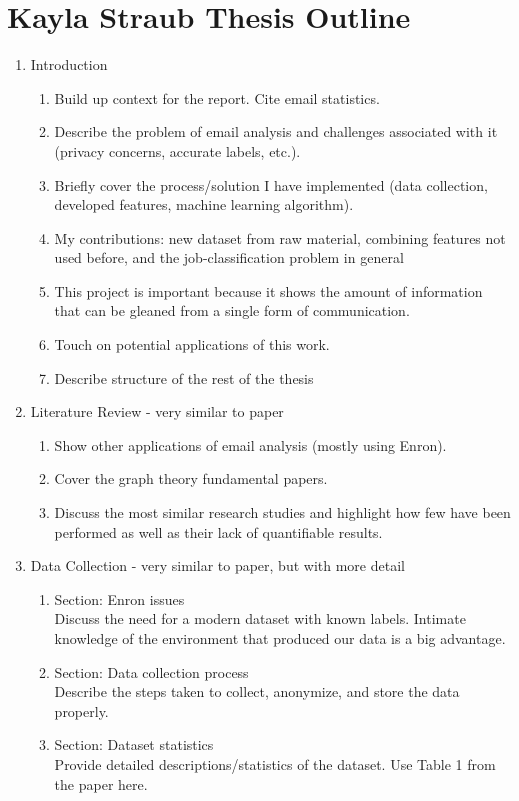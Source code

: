 \documentclass[12pt,dvips]{report}
\begin{document}
\section*{Kayla Straub Thesis Outline}
\begin{enumerate}
\item Introduction 
\begin{enumerate}
\item Build up context for the report.  Cite email statistics.  
\item Describe the problem of email analysis and challenges associated with it (privacy concerns, accurate labels, etc.).  
\item Briefly cover the process/solution I have implemented (data collection, developed features, machine learning algorithm).
\item My contributions: new dataset from raw material, combining features not used before, and the job-classification problem in general 
\item This project is important because it shows the amount of information that can be gleaned from a single form of communication. 
\item Touch on potential applications of this work.
\item Describe structure of the rest of the thesis
\end{enumerate}

\item Literature Review - very similar to paper
\begin{enumerate}
\item Show other applications of email analysis (mostly using Enron).  
\item Cover the graph theory fundamental papers.  
\item Discuss the most similar research studies and highlight how few have been performed as well as their lack of quantifiable results.
\end{enumerate}

\item Data Collection - very similar to paper, but with more detail
\begin{enumerate}
\item Section: Enron issues\\
Discuss the need for a modern dataset with known labels.  Intimate knowledge of the environment that produced our data is a big advantage.  
\item Section: Data collection process \\ Describe the steps taken to collect, anonymize, and store the data properly.  
\item Section: Dataset statistics\\ Provide detailed descriptions/statistics of the dataset.  Use Table 1 from the paper here.
\end{enumerate}


\end{enumerate}
\end{document}
